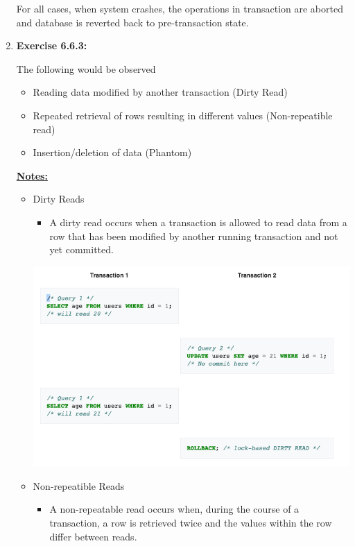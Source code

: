 \documentclass[12pt]{article}
\begin{document}
\begin{enumerate}[1.]
    \bigskip

    For all cases, when system crashes, the operations in transaction are aborted
    and database is reverted back to pre-transaction state.

    \item \textbf{Exercise 6.6.3:}

    \bigskip

    The following would be observed

    \bigskip

    \begin{itemize}
        \item Reading data modified by another transaction (Dirty Read)
        \item Repeated retrieval of rows resulting in different values (Non-repeatible read)
        \item Insertion/deletion of data (Phantom)
    \end{itemize}

    \bigskip

    \underline{\textbf{Notes:}}

    \bigskip

    \begin{itemize}
        \item Dirty Reads
        \begin{itemize}
            \item A dirty read occurs when a transaction is allowed to read data from a row that has been modified by
            another running transaction and not yet committed.
        \end{itemize}

        \begin{center}
        \includegraphics[width=0.7\linewidth]{images/worksheet_6_solution_1.png}
        \end{center}

        \item Non-repeatible Reads
        \begin{itemize}
            \item A non-repeatable read occurs when, during the course of a transaction,
            a row is retrieved twice and the values within the row differ between reads.
        \end{itemize}


\end{itemize}
\end{enumerate}
\end{document}
